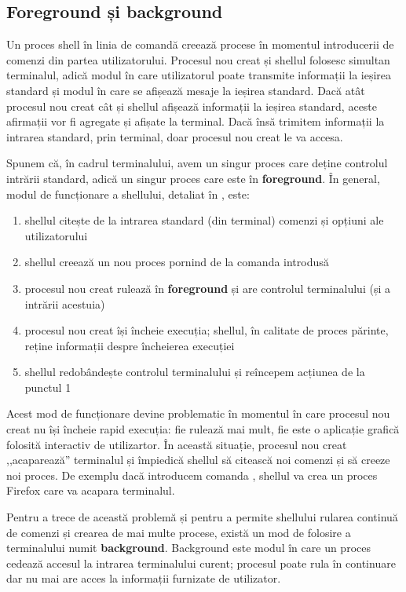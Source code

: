 \subsection{Foreground și background}
\label{sec:process:foreground-background}

Un proces shell în linia de comandă creează procese în momentul introducerii de comenzi din partea utilizatorului.
Procesul nou creat și shellul folosesc simultan terminalul, adică modul în care utilizatorul poate transmite informații la ieșirea standard și modul în care se afișează mesaje la ieșirea standard.
Dacă atât procesul nou creat cât și shellul afișează informații la ieșirea standard, aceste afirmații vor fi agregate și afișate la terminal.
Dacă însă trimitem informații la intrarea standard, prin terminal, doar procesul nou creat le va accesa.

Spunem că, în cadrul terminalului, avem un singur proces care deține controlul intrării standard, adică un singur proces care este în \textbf{foreground}.
În general, modul de funcționare a shellului, detaliat în , este:

\begin{enumerate}
  \item shellul citește de la intrarea standard (din terminal) comenzi și opțiuni ale utilizatorului
  \item shellul creează un nou proces pornind de la comanda introdusă
  \item procesul nou creat rulează în \textbf{foreground} și are controlul terminalului (și a intrării acestuia)
  \item procesul nou creat își încheie execuția;
    shellul, în calitate de proces părinte, reține informații despre încheierea execuției
  \item shellul redobândește controlul terminalului și reîncepem acțiunea de la punctul 1
\end{enumerate}

Acest mod de funcționare devine problematic în momentul în care procesul nou creat nu își încheie rapid execuția: fie rulează mai mult, fie este o aplicație grafică folosită interactiv de utilizartor.
În această situație, procesul nou creat ,,acaparează'' terminalul și împiedică shellul să citească noi comenzi și să creeze noi proces.
De exemplu dacă introducem comanda , shellul va crea un proces Firefox care va acapara terminalul.

Pentru a trece de această problemă și pentru a permite shellului rularea continuă de comenzi și crearea de mai multe procese, există un mod de folosire a terminalului numit \textbf{background}.
Background este modul în care un proces cedează accesul la intrarea terminalului curent;
procesul poate rula în continuare dar nu mai are acces la informații furnizate de utilizator.

